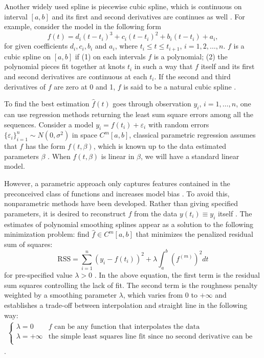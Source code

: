 Another widely used spline is piecewise cubic spline, which is continuous on interval $[a,b]$ and its first and second derivatives are continues as well \cite{wolberg1988cubic}. For example, consider the model in the following form 
\begin{equation*}
f(t)=d_i(t-t_i)^3+c_i(t-t_i)^2+b_i(t-t_i)+a_i,
\end{equation*}
for given coefficients $d_i, c_i, b_i$ and $a_i$, where $t_i\leq t\leq t_{i+1}$, $i=1,2,\ldots,n$. $f$ is a cubic spline on $[a,b]$ if (1) on each intervals $f$ is a polynomial; (2) the polynomial pieces fit together at knots $t_i$ in such a way that $f$ itself and its first and second derivatives are continuous at each $t_i$. If the second and third derivatives of $f$ are zero at 0 and 1, $f$ is said to be a natural cubic spline \cite{green1993nonparametric}. 


To find the best estimation $\hat{f}(t)$ goes through observation $y_i$, $i=1,\ldots,n$, one can use regression methods returning the least sum square errors among all the sequences. Consider a model $y_i=f(t_i)+\varepsilon_i$ with random errors $\{\varepsilon_i\}_{i=1}^n \sim N(0,\sigma^2)$ in space $\mathit{C}^m[a,b]$, classical parametric regression assumes that $f$ has the form $f(t,\beta)$, which is known up to the data estimated parameters $\beta$ \cite{kim2004smoothing}. When $f(t,\beta)$ is linear in $\beta$, we will have a standard linear model. 


However, a parametric approach only captures features contained in the preconceived class of functions and increases model bias \cite{yao2005functional}. To avoid this, nonparametric methods have been developed. Rather than giving specified parameters, it is desired to reconstruct $f$ from the data $y(t_i)\equiv y_i$ itself  \cite{craven1978smoothing}. The estimates of polynomial smoothing splines appear as a solution to the following minimization problem: find $\hat{f} \in \mathit{C}^m[a,b]$ that minimizes the penalized residual sum of squares: 
\begin{equation}\label{introSmoothingOb}
\mbox{RSS}=\sum_{i=1}^{n}\left(  y_i-f(t_i)\right) ^2+\lambda\int_a^b \left(f^{(m)}\right)^2 dt
\end{equation}
for pre-specified value $\lambda>0$ \cite{aydin2012smoothing}. In the above equation, the first term is the residual sum squares controlling the lack of fit. The second term is the roughness penalty weighted by a smoothing parameter $\lambda$, which varies from $0$ to $+\infty$ and establishes a trade-off between interpolation and straight line in the following way: 
\begin{align*}
\begin{cases}
\lambda = 0  & \mbox{$f$ can be any function that interpolates the data}\\
\lambda = +\infty & \mbox{the simple least squares line fit since no second derivative can be tolerated}\\
\end{cases}
\end{align*}\cite{esl2009}. 

